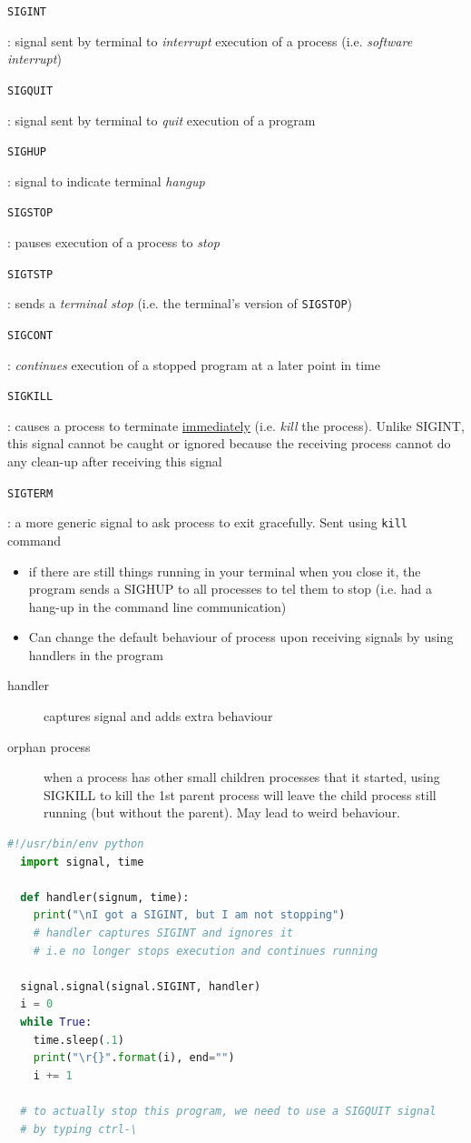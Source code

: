 \documentclass[letterpaper,12pt]{article}
\newcommand*{\lstitem}[1]{
  \setbox0\hbox{\lstinline{#1}}
  \item[\usebox0]
}
\begin{document}
\begin{description}
 \lstitem{SIGINT}: signal sent by terminal to \textit{interrupt} execution of a process (i.e. \textit{software interrupt})
 \lstitem{SIGQUIT}: signal sent by terminal to \textit{quit} execution of a program
 \lstitem{SIGHUP}: signal to indicate terminal \textit{hangup}
 \lstitem{SIGSTOP}: pauses execution of a process to \textit{stop}
 \lstitem{SIGTSTP}: sends a \textit{terminal stop} (i.e. the terminal's version of \lstinline{SIGSTOP})
 \lstitem{SIGCONT}: \textit{continues} execution of a stopped program at a later point in time
 \lstitem{SIGKILL}: causes a process to terminate \underline{immediately} (i.e. \textit{kill} the process). Unlike SIGINT, this signal cannot be caught or ignored because the receiving process cannot do any clean-up after receiving this signal
 \lstitem{SIGTERM}: a more generic signal to ask process to exit gracefully. Sent using \lstinline{kill} command
\end{description}

\begin{itemize}
 \item if there are still things running in your terminal when you close it, the program sends a SIGHUP to all processes to tel them to stop (i.e. had a hang-up in the command line communication)
 \item Can change the default behaviour of process upon receiving signals by using handlers in the program
\end{itemize}

\begin{description}
 \item[handler] captures signal and adds extra behaviour
 \item[orphan process] when a process has other small children processes that it started, using SIGKILL to kill the 1st parent process will leave the child process still running (but without the parent). May lead to weird behaviour.
\end{description}


\begin{lstlisting}[language=python]
  #!/usr/bin/env python
  import signal, time

  def handler(signum, time):
    print("\nI got a SIGINT, but I am not stopping")
    # handler captures SIGINT and ignores it
    # i.e no longer stops execution and continues running

  signal.signal(signal.SIGINT, handler)
  i = 0
  while True:
    time.sleep(.1)
    print("\r{}".format(i), end="")
    i += 1

  # to actually stop this program, we need to use a SIGQUIT signal
  # by typing ctrl-\
\end{lstlisting}
\end{document}
